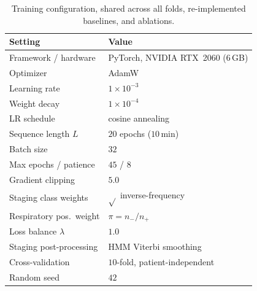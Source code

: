 \documentclass[journal]{IEEEtran}
\newcommand{\mmAcc}{0.722}
\newcommand{\mmMf}{0.651}
\newcommand{\mmK}{0.611}
\newcommand{\mmAuc}{0.711}
\newcommand{\mmAp}{0.337}
\providecommand{\DIFaddbeginFL}{} %
\providecommand{\DIFaddendFL}{} %
\providecommand{\DIFdelbeginFL}{} %
\providecommand{\DIFdelendFL}{} %
\providecommand{\DIFscaledelfig}{0.5}
\newlength{\DIFdelgraphicswidth} %
\newlength{\DIFdelgraphicsheight} %
\providecommand{\DIFaddincludegraphics}[2][]{{\color{blue}\fbox{\DIFOincludegraphics[#1]{#2}}}} %
\providecommand{\DIFdelincludegraphics}[2][]{%
\sbox{\DIFdelgraphicsbox}{\DIFOincludegraphics[#1]{#2}}%
\settoboxwidth{\DIFdelgraphicswidth}{\DIFdelgraphicsbox} %
\settoboxtotalheight{\DIFdelgraphicsheight}{\DIFdelgraphicsbox} %
\scalebox{\DIFscaledelfig}{%
\parbox[b]{\DIFdelgraphicswidth}{\usebox{\DIFdelgraphicsbox}\\[-\baselineskip] \rule{\DIFdelgraphicswidth}{0em}}\llap{\resizebox{\DIFdelgraphicswidth}{\DIFdelgraphicsheight}{%
\setlength{\unitlength}{\DIFdelgraphicswidth}%
\begin{picture}(1,1)%
\thicklines\linethickness{2pt} %
{\color[rgb]{1,0,0}\put(0,0){\framebox(1,1){}}}%
{\color[rgb]{1,0,0}\put(0,0){\line( 1,1){1}}}%
{\color[rgb]{1,0,0}\put(0,1){\line(1,-1){1}}}%
\end{picture}%
}\hspace*{3pt}}} %
} %
\DeclareRobustCommand{\DIFaddbeginFL}{\DIFOaddbeginFL \let\includegraphics\DIFaddincludegraphics} %
\DeclareRobustCommand{\DIFaddendFL}{\DIFOaddendFL \let\includegraphics\DIFOincludegraphics} %
\DeclareRobustCommand{\DIFdelbeginFL}{\DIFOdelbeginFL \let\includegraphics\DIFdelincludegraphics} %
\DeclareRobustCommand{\DIFdelendFL}{\DIFOaddendFL \let\includegraphics\DIFOincludegraphics} %
\begin{document}
\begin{table}[t]
\DIFdelbeginFL %
\DIFdelendFL \DIFaddbeginFL \caption{Training configuration, shared across all folds, re-implemented baselines, and ablations.}
\label{tab:hyper}
\DIFaddendFL \centering
\DIFdelbeginFL %
\DIFdelendFL \DIFaddbeginFL \small
\begin{tabular}{ll}
\toprule
Setting & Value \\
\midrule
Framework / hardware & PyTorch, NVIDIA RTX~2060 (6\,GB) \\
Optimizer & AdamW \\
Learning rate & $1\times10^{-3}$ \\
Weight decay & $1\times10^{-4}$ \\
LR schedule & cosine annealing \\
Sequence length $L$ & $20$ epochs ($10$\,min) \\
Batch size & $32$ \\
Max epochs / patience & $45$ / $8$ \\
Gradient clipping & $5.0$ \\
Staging class weights & $\sqrt{}$ inverse-frequency \\
Respiratory pos.\ weight & $\pi=n_-/n_+$ \\
Loss balance $\lambda$ & $1.0$ \\
Staging post-processing & HMM Viterbi smoothing \\
Cross-validation & $10$-fold, patient-independent \\
Random seed & $42$ \\
\bottomrule
\end{tabular}
\DIFaddendFL \end{table}
\end{document}
